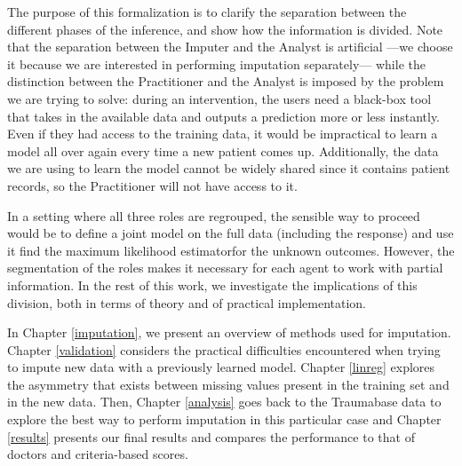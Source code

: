The purpose of this formalization is to clarify the separation between the different phases of the inference, and show how the information is divided. Note that the separation between the Imputer and the Analyst is artificial ---we choose it because we are interested in performing imputation separately--- while the distinction between the Practitioner and the Analyst is imposed by the problem we are trying to solve: during an intervention, the users need a black-box tool that takes in the available data and outputs a prediction more or less instantly. Even if they had access to the training data, it would be impractical to learn a model all over again every time a new patient comes up. Additionally, the data we are using to learn the model cannot be widely shared since it contains patient records, so the Practitioner will not have access to it.

In a setting where all three roles are regrouped, the sensible way to proceed would be to define a joint model on the full data (including the response) and use it find the maximum likelihood estimatorfor the unknown outcomes. However, the segmentation of the roles makes it necessary for each agent to work with partial information. In the rest of this work, we investigate the implications of this division, both in terms of theory and of practical implementation.

In Chapter \ref{imputation}, we present an overview of methods used for imputation. Chapter \ref{validation} considers the practical difficulties encountered when trying to impute new data with a previously learned model. Chapter \ref{linreg} explores the asymmetry that exists between missing values present in the training set and in the new data. Then, Chapter \ref{analysis} goes back to the Traumabase data to explore the best way to perform imputation in this particular case and Chapter \ref{results} presents our final results and compares the performance to that of doctors and criteria-based scores.